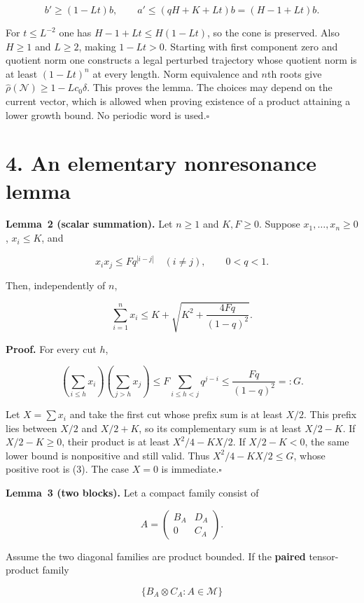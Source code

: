 \documentclass[11pt,a4paper]{article}
\begin{document}
\[
b'\ge(1-Lt)b,\qquad
a'\le(qH+K+Lt)b=(H-1+Lt)b.
\]

For \(t\le L^{-2}\) one has \(H-1+Lt\le H(1-Lt)\), so the cone is preserved. Also \(H\ge1\) and \(L\ge2\), making \(1-Lt>0\). Starting with first component zero and quotient norm one constructs a legal perturbed trajectory whose quotient norm is at least \((1-Lt)^n\) at every length. Norm equivalence and \(n\)th roots give \(\widehat\rho(\mathcal N)\ge1-Lc_0\delta\). This proves the lemma. The choices may depend on the current vector, which is allowed when proving existence of a product attaining a lower growth bound. No periodic word is used.\unskip\nobreak\hfill\(\square\)

\section{4. An elementary nonresonance lemma}\label{an-elementary-nonresonance-lemma}

\textbf{Lemma~2 (scalar summation).} Let \(n\ge1\) and \(K,F\ge0\). Suppose \(x_1,\ldots,x_n\ge0\), \(x_i\le K\), and

\[
x_ix_j\le Fq^{|i-j|}\quad(i\ne j),\qquad 0<q<1.
\]

Then, independently of \(n\),

\[
\sum_{i=1}^n x_i\le K+\sqrt{K^2+\frac{4Fq}{(1-q)^2}}.
\tag{3}
\]

\textbf{Proof.} For every cut \(h\),

\[
\left(\sum_{i\le h}x_i\right)\left(\sum_{j>h}x_j\right)
\le F\sum_{i\le h<j}q^{j-i}\le\frac{Fq}{(1-q)^2}=:G.
\]

Let \(X=\sum x_i\) and take the first cut whose prefix sum is at least \(X/2\). This prefix lies between \(X/2\) and \(X/2+K\), so its complementary sum is at least \(X/2-K\). If \(X/2-K\ge0\), their product is at least \(X^2/4-KX/2\). If \(X/2-K<0\), the same lower bound is nonpositive and still valid. Thus \(X^2/4-KX/2\le G\), whose positive root is (3). The case \(X=0\) is immediate.\unskip\nobreak\hfill\(\square\)

\textbf{Lemma~3 (two blocks).} Let a compact family consist of

\[
A=\begin{pmatrix}B_A&D_A\\0&C_A\end{pmatrix}.
\]

Assume the two diagonal families are product bounded. If the \textbf{paired} tensor-product family

\[
\{B_A\otimes C_A:A\in\mathcal M\}
\]
\end{document}
